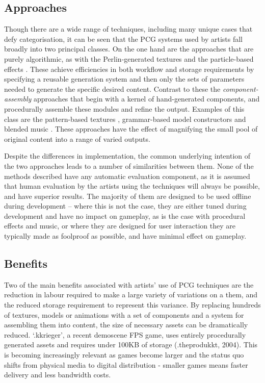 \documentclass{acm_proc_article-sp}
\begin{document}
\subsection{Approaches}
\label{sec:artist-approaches}
Though there are a wide range of techniques, including many unique cases that defy categorisation, it can be seen that the PCG systems used by artists fall broadly into two principal classes. On the one hand are the approaches that are purely algorithmic, as with the Perlin-generated textures \cite{perlin2002improving} and the particle-based effects \cite{reeves1983particle}. These achieve efficiencies in both workflow and storage requirements by specifying a reusable generation system and then only the sets of parameters needed to generate the specific desired content. Contrast to these the \textit{component-assembly} approaches that begin with a kernel of hand-generated components, and procedurally assemble these modules and refine the output. Examples of this class are the pattern-based textures \cite{patternTextures}, grammar-based model constructors \cite{dart2011speedrock} and blended music \cite{6266725}. These approaches have the effect of magnifying the small pool of original content into a range of varied outputs.

Despite the differences in implementation, the common underlying intention of the two approaches leads to a number of similarities between them. None of the methods described have any automatic evaluation component, as it is assumed that human evaluation by the artists using the techniques will always be possible, and have superior results. The majority of them are designed to be used offline during development -- where this is not the case, they are either tuned during development and have no impact on gameplay, as is the case with procedural effects and music, or where they are designed for user interaction they are typically made as foolproof as possible, and have minimal effect on gameplay.

\subsection{Benefits} %
Two of the main benefits associated with artists' use of PCG techniques are the reduction in labour required to make a large variety of variations on a them, and the reduced storage requirement to represent this variance. By replacing hundreds of textures, models or animations with a set of components and a system for assembling them into content, the size of necessary assets can be dramatically reduced. `.kkrieger', a recent demoscene FPS game, uses entirely procedurally generated assets and requires under 100KB of storage (.theprodukkt, 2004). This is becoming increasingly relevant as games become larger and the status quo shifts from physical media to digital distribution - smaller games means faster delivery and less bandwidth costs. %
\end{document}
